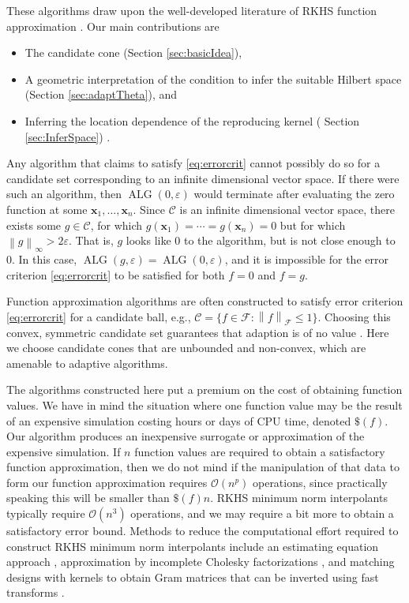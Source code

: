 \documentclass[]{mcom-l}
\theoremstyle{remark}
\DeclareMathOperator{\ALG}{ALG}
\newcommand{\bx}{{\boldsymbol{x}}}
\newcommand{\cc}{\mathcal{C}}
\newcommand{\calf}{{\mathcal{F}}}
\newcommand{\norm}[2][{}]{\ensuremath{\left \lVert #2 \right \rVert}_{#1}}
\newcommand{\Order}{\mathcal{O}}
\begin{document}
These algorithms draw upon the well-developed literature of RKHS function approximation \cite{Buh03a,Fas07a,FasMcC15a,ForFly15a,ForEtal09,RasWil06a,SchWen06a,Wah85a,Wen05a}.  Our main contributions are 
\begin{itemize}
	\item The candidate cone (Section \ref{sec:basicIdea}),
	\item A geometric interpretation of the condition to infer the suitable Hilbert space (Section  \ref{sec:adaptTheta}), and
	\item Inferring the location dependence of the reproducing kernel ( Section \ref{sec:InferSpace}) .
\end{itemize}

Any algorithm that claims to satisfy \eqref{eq:errorcrit} cannot possibly do so for a candidate set corresponding to an infinite dimensional vector space.  If there were such an algorithm, then $\ALG(0,\varepsilon)$ would terminate after evaluating the zero function at some $\bx_1, \ldots, \bx_n$.  Since $\cc$ is an infinite dimensional vector space, there exists some $g \in \cc$, for which $g(\bx_1) = \cdots = g(\bx_n) = 0$ but for which $\norm[\infty]{g} > 2 \varepsilon$.  That is, $g$ looks like $0$ to the algorithm, but is not close enough to $0$.  In this case, $\ALG(g,\varepsilon) = \ALG(0,\varepsilon)$, and it is impossible for the error criterion \eqref{eq:errorcrit} to be satisfied for both $f=0$ and $f = g$.

Function approximation algorithms are often constructed to satisfy error criterion \eqref{eq:errorcrit} for a candidate ball, e.g., $\cc = \{f \in \calf : \norm[\calf]{f} \le 1\}$.  Choosing this convex, symmetric candidate set guarantees that adaption is of no value \cite{Bak71}.  Here we choose candidate cones that are unbounded and non-convex, which are amenable to adaptive algorithms.

The algorithms constructed here put a premium on the cost of obtaining function values.  We have in mind the situation where one function value may be the result of an expensive simulation costing hours or days of CPU time, denoted $\$(f)$.  Our algorithm produces an inexpensive surrogate or approximation of the expensive simulation.  If $n$ function values are required to obtain a satisfactory function approximation, then we do not mind if the manipulation of that data to form our function approximation requires $\Order(n^p)$ operations, since practically speaking this will be smaller than $\$(f) n$.  RKHS minimum  norm interpolants typically require $\Order(n^3)$ operations, and we may require a bit more to obtain a satisfactory error bound.  Methods to reduce the computational effort required to construct RKHS minimum norm interpolants include an estimating equation approach \cite{AniCheSte16a}, approximation by incomplete Cholesky factorizations \cite{OwhEtal19a}, and matching designs with kernels to obtain Gram matrices that can be inverted using fast transforms \cite{RatHic19a}.
\end{document}
